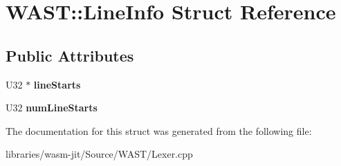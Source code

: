 \hypertarget{struct_w_a_s_t_1_1_line_info}{}\section{W\+A\+ST\+:\+:Line\+Info Struct Reference}
\label{struct_w_a_s_t_1_1_line_info}
\subsection*{Public Attributes}
\begin{DoxyCompactItemize}
\item 
\mbox{\label{struct_w_a_s_t_1_1_line_info_a9126d0f1e7b90b40a84a99c713b6debd}} 
U32 $\ast$ {\bfseries line\+Starts}
\item 
\mbox{\label{struct_w_a_s_t_1_1_line_info_a414b827a7ed94595b5e77b85f0df31a0}} 
U32 {\bfseries num\+Line\+Starts}
\end{DoxyCompactItemize}


The documentation for this struct was generated from the following file\+:\begin{DoxyCompactItemize}
\item 
libraries/wasm-\/jit/\+Source/\+W\+A\+S\+T/Lexer.\+cpp\end{DoxyCompactItemize}
